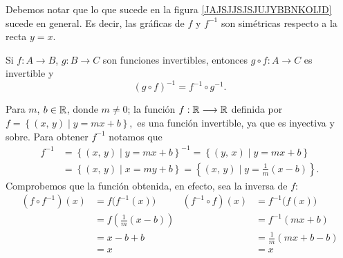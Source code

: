 \begin{obs}{}{}
    Debemos notar que lo que sucede en la figura \ref{JAJSJJSJSJUJYBBNKOIJD} sucede en general. Es decir, las gráficas de $f$ y $f^{-1}$ son simétricas respecto a la recta $y = x$.
    \begin{center}
    \end{center}
\end{obs}

\begin{theorem}{}{}
    Si $f:A \longrightarrow B$, $g: B \longrightarrow C$ son funciones invertibles, entonces $g \circ f:A \longrightarrow C$ es invertible y
    $$(g \circ f)^{-1} = f^{-1} \circ g^{-1}.$$
\end{theorem}

\begin{myexample}
    Para $m$, $b \in \RR$, donde $m \neq 0$; la función $f: \RR \longrightarrow \RR$ definida por
    $f = \left\{ (x, \, y) \mid y = mx + b \right\},$
    es una función invertible, ya que es inyectiva y sobre. Para obtener $f^{-1}$ notamos que
    \begin{align*}
        f^{-1} & = \left\{ (x, \, y) \mid y = mx + b \right\}^{-1} = \left\{ (y, \, x) \mid y = mx + b \right\} \\
        & = \left\{ (x, \, y) \mid x = my + b \right\} = \left\{ (x, \, y) \mid y = \frac{1}{m} (x-b) \right\}.
    \end{align*}
    Comprobemos que la función obtenida, en efecto, sea la inversa de $f$:
    \begin{align*}
        (f \circ f^{-1})(x) & = f\big( f^{-1}(x)\big) & (f^{-1} \circ f)(x) & = f^{-1}\big( f(x)\big) \\
        & = f\left( \frac{1}{m} (x-b) \right) & & = f^{-1}(mx+b) \\
        & = x - b + b & & = \frac{1}{m} (mx +b - b) \\
        & = x & & = x
    \end{align*}
\end{myexample}

